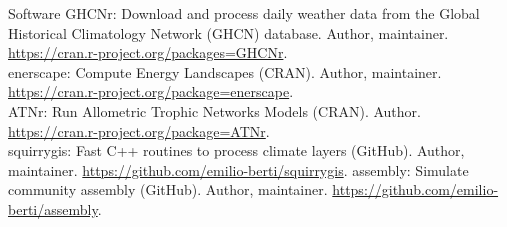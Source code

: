\documentclass{resume} %
\begin{document}
\begin{rSection}{Software}
GHCNr: Download and process daily weather data from the Global Historical Climatology Network (GHCN) database. Author, maintainer. \url{https://cran.r-project.org/packages=GHCNr}.\\
enerscape: Compute Energy Landscapes (CRAN). Author, maintainer. \url{https://cran.r-project.org/package=enerscape}.\\
ATNr: Run Allometric Trophic Networks Models (CRAN). Author. \url{https://cran.r-project.org/package=ATNr}.\\
squirrygis: Fast C++ routines to process climate layers (GitHub). Author, maintainer. \url{https://github.com/emilio-berti/squirrygis}.
assembly: Simulate community assembly (GitHub). Author, maintainer. \url{https://github.com/emilio-berti/assembly}.
\end{rSection}
\end{document}
